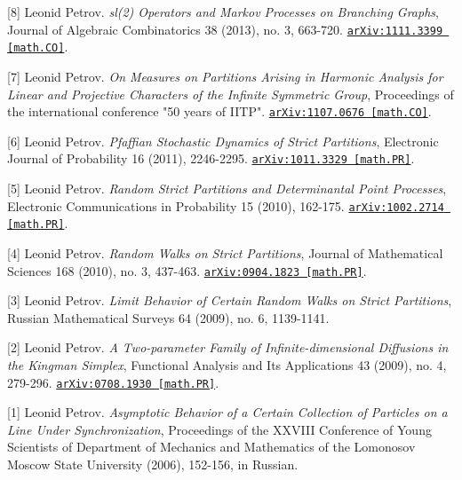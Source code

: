 \begin{etaremune}
\item[{[8]}] 
Leonid Petrov.
\emph{sl(2) Operators and Markov Processes on Branching Graphs}, Journal of Algebraic Combinatorics 38 (2013), no. 3, 663-720. 
\href{https://arxiv.org/abs/1111.3399}{\texttt{arXiv:1111.3399 [math.CO]}}.







\item[{[7]}] 
Leonid Petrov.
\emph{On Measures on Partitions Arising in Harmonic Analysis for Linear and Projective Characters of the Infinite Symmetric Group}, Proceedings of the international conference "50 years of IITP". 
\href{https://arxiv.org/abs/1107.0676}{\texttt{arXiv:1107.0676 [math.CO]}}.





\item[{[6]}] 
Leonid Petrov.
\emph{Pfaffian Stochastic Dynamics of Strict Partitions}, Electronic Journal of Probability 16 (2011), 2246-2295. 
\href{https://arxiv.org/abs/1011.3329}{\texttt{arXiv:1011.3329 [math.PR]}}.



\item[{[5]}] 
Leonid Petrov.
\emph{Random Strict Partitions and Determinantal Point Processes}, Electronic Communications in Probability 15 (2010), 162-175. 
\href{https://arxiv.org/abs/1002.2714}{\texttt{arXiv:1002.2714 [math.PR]}}.







\item[{[4]}] 
Leonid Petrov.
\emph{Random Walks on Strict Partitions}, Journal of Mathematical Sciences 168 (2010), no. 3, 437-463. 
\href{https://arxiv.org/abs/0904.1823}{\texttt{arXiv:0904.1823 [math.PR]}}.



\item[{[3]}] 
Leonid Petrov.
\emph{Limit Behavior of Certain Random Walks on Strict Partitions}, Russian Mathematical Surveys 64 (2009), no. 6, 1139-1141. 




\item[{[2]}] 
Leonid Petrov.
\emph{A Two-parameter Family of Infinite-dimensional Diffusions in the Kingman Simplex}, Functional Analysis and Its Applications 43 (2009), no. 4, 279-296. 
\href{https://arxiv.org/abs/0708.1930}{\texttt{arXiv:0708.1930 [math.PR]}}.



\item[{[1]}] 
Leonid Petrov.
\emph{Asymptotic Behavior of a Certain Collection of Particles on a Line Under Synchronization}, Proceedings of the XXVIII Conference of Young Scientists of Department of Mechanics and Mathematics of the Lomonosov Moscow State University (2006), 152-156, in Russian. 



\end{etaremune}



